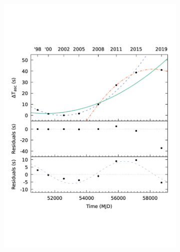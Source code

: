 \documentclass[graybox]{svmult}
\begin{document}
\begin{figure}
\begin{subfigure}{.5\textwidth}
  \centering
  \includegraphics[width=1.0\linewidth]{REVIEW_AMXP/1808_orb_2}
  \label{fig:sfig1}
\end{subfigure}%
\begin{subfigure}{.5\textwidth}
  \centering

\end{subfigure}
\end{figure}
\end{document}
